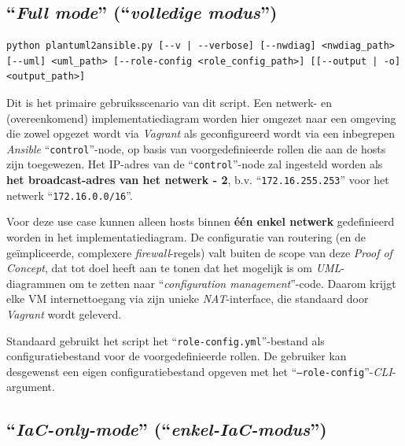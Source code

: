 \subsection{``\emph{Full mode}'' (``\emph{volledige modus}'')}%
\label{subsec:fullmode}

\begin{codeblock}
  \begin{lstlisting}
python plantuml2ansible.py [--v | --verbose] [--nwdiag] <nwdiag_path> [--uml] <uml_path> [--role-config <role_config_path>] [[--output | -o] <output_path>]
\end{lstlisting}
  \caption[\emph{CLI}-gebruik ``\emph{full mode}'']{\emph{CLI}-gebruik voor het ``\emph{full mode}''-gebruiksscenario}
  \label{code:cli_gebruik_full_mode}
\end{codeblock}

Dit is het primaire gebruiksscenario van dit script. Een netwerk- en (overeenkomend) implementatiediagram worden hier omgezet naar een omgeving die zowel opgezet wordt via \emph{Vagrant} als geconfigureerd wordt via een inbegrepen \emph{Ansible} ``\texttt{control}''-node, op basis van voorgedefinieerde rollen die aan de hosts zijn toegewezen. Het IP-adres van de ``\texttt{control}''-node zal ingesteld worden als \textbf{het broadcast-adres van het netwerk - 2}, b.v. ``\texttt{172.16.255.253}'' voor het netwerk ``\texttt{172.16.0.0/16}''.

Voor deze use case kunnen alleen hosts binnen \textbf{één enkel netwerk} gedefinieerd worden in het implementatiediagram. De configuratie van routering (en de geïmpliceerde, complexere \emph{firewall}-regels) valt buiten de scope van deze \emph{Proof of Concept}, dat tot doel heeft aan te tonen dat het mogelijk is om \emph{UML}-diagrammen om te zetten naar ``\emph{configuration management}''-code. Daarom krijgt elke VM internettoegang via zijn unieke \emph{NAT}-interface, die standaard door \emph{Vagrant} wordt geleverd.

Standaard gebruikt het script het ``\texttt{role-config.yml}''-bestand als configuratiebestand voor de voorgedefinieerde rollen. De gebruiker kan desgewenst een eigen configuratiebestand opgeven met het ``\texttt{--role-config}''-\emph{CLI}-argument.

\subsection{``\emph{IaC-only-mode}'' (``\emph{enkel-IaC-modus}'')}%
\label{subsec:iaconlymode}

